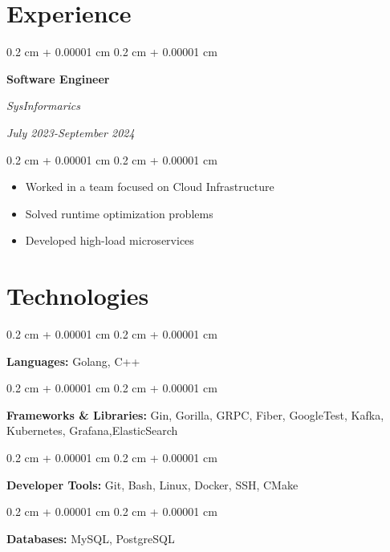 \documentclass[10pt, letterpaper]{article}
\newenvironment{highlights}{
    \begin{itemize}[
        topsep=0.10 cm,
        parsep=0.10 cm,
        partopsep=0pt,
        itemsep=0pt,
        leftmargin=0.4 cm + 10pt
    ]
}{
    \end{itemize}
}
\newenvironment{onecolentry}{
    \begin{adjustwidth}{
        0.2 cm + 0.00001 cm
    }{
        0.2 cm + 0.00001 cm
    }
}{
    \end{adjustwidth}
}
\newenvironment{twocolentry}[2][]{
    \onecolentry
    \def\secondColumn{#2}
    \setcolumnwidth{\fill, 4.5 cm}
    \begin{paracol}{2}
}{
    \switchcolumn \raggedleft \secondColumn
    \end{paracol}
    \endonecolentry
}
\begin{document}
\section{Experience}
\begin{twocolentry}{\textit{July 2023-September 2024}}
    \textbf{Software Engineer}

    \textit{SysInformarics}
\end{twocolentry}

\vspace{0.10cm}
\begin{onecolentry}
    \begin{highlights}
        \item Worked in a team focused on Cloud Infrastructure
        \item Solved runtime optimization problems
        \item Developed high-load microservices
    \end{highlights}
\end{onecolentry}

\section{Technologies}

\begin{onecolentry}
    \textbf{Languages:} Golang, C++
\end{onecolentry}

\vspace{0.2cm}

\begin{onecolentry}
    \textbf{Frameworks \& Libraries:} Gin, Gorilla, GRPC, Fiber, GoogleTest, Kafka, Kubernetes, Grafana,ElasticSearch
\end{onecolentry}

\vspace{0.2cm}

\begin{onecolentry}
    \textbf{Developer Tools:} Git, Bash, Linux, Docker, SSH, CMake
\end{onecolentry}

\vspace{0.2cm}

\begin{onecolentry}
    \textbf{Databases:} MySQL, PostgreSQL
\end{onecolentry}

\vspace{0.2cm}
\end{document}
